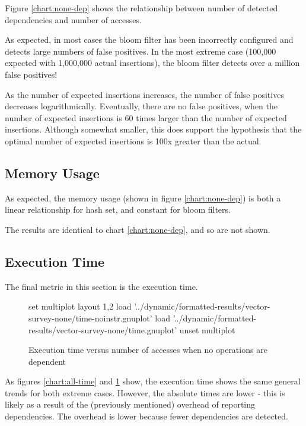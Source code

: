 	Figure \ref{chart:none-dep} shows the relationship between number of detected dependencies and number of accesses.
	
	As expected, in most cases the bloom filter has been incorrectly configured and detects large numbers of false positives. In the most extreme case (100,000 expected with 1,000,000 actual insertions), the bloom filter detects over a million false positives!
	
	As the number of expected insertions increases, the number of false positives decreases logarithmically. Eventually, there are no false positives, when the number of expected insertions is 60 times larger than the number of expected insertions. Although somewhat smaller, this does support the hypothesis that the optimal number of expected insertions is 100x greater than the actual.
	
	\subsection{Memory Usage} \label{sec:results/none/mem}
	As expected, the memory usage (shown in figure \ref{chart:none-dep}) is both a linear relationship for hash set, and constant for bloom filters.
	
	The results are identical to chart \ref{chart:none-dep}, and so are not shown.
	
	\subsection{Execution Time} \label{sec:results/none/time}
	The final metric in this section is the execution time.
	
	\begin{figure}
		\centering
		\begin{gnuplot}[terminal=pdf]
			set multiplot layout 1,2
				load '../dynamic/formatted-results/vector-survey-none/time-noinstr.gnuplot'		
				load '../dynamic/formatted-results/vector-survey-none/time.gnuplot'
			unset multiplot
		\end{gnuplot}
		\caption{Execution time versus number of accesses when no operations are dependent}
		\label{chart:none-time}
	\end{figure}
	
	As figures \ref{chart:all-time} and \ref{chart:none-time} show, the execution time shows the same general trends for both extreme cases. However, the absolute times are lower - this is likely as a result of the (previously mentioned) overhead of reporting dependencies. The overhead is lower because fewer dependencies are detected.
	
